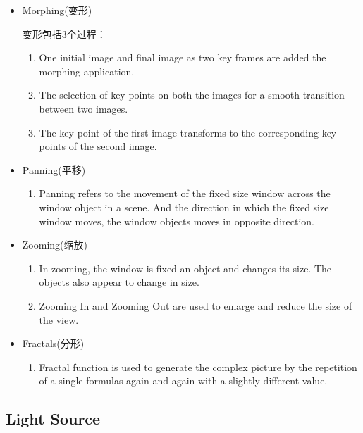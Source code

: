 \documentclass[UTF8]{ctexart}
\begin{document}
\begin{itemize}
    \item Morphing(变形)
    
    变形包括3个过程：
    \begin{enumerate}
        \item One initial image and final image as two key frames are added the morphing application.
        \item The selection of key points on both the images for a smooth transition between two images.
        \item The key point of the first image transforms to the corresponding key points of the second image.
    \end{enumerate}

    \item Panning(平移)
    \begin{enumerate}
        \item Panning refers to the movement of the fixed size window across the window object in a scene. And the direction in which the fixed size window moves, the window objects moves in opposite direction.
    \end{enumerate}
    \item Zooming(缩放)
    \begin{enumerate}
        \item In zooming, the window is fixed an object and changes its size. The objects also appear to change in size.
        \item Zooming In and Zooming Out are used to enlarge and reduce the size of the view.
    \end{enumerate}
    \item Fractals(分形)
    \begin{enumerate}
        \item Fractal function is used to generate the complex picture by the repetition of a single formulas again and again with a slightly different value.
    \end{enumerate}
\end{itemize}

\subsection{Light Source}
\end{document}
